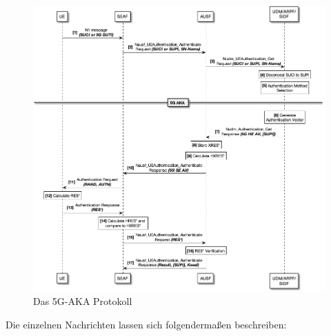 \begin{figure}[H]
  \centering
  \includegraphics[width=\textwidth]{uml/protocol_v1.png}
  \caption{Das 5G-AKA Protokoll}
  \label{fig:protocol_v1}
\end{figure}

Die einzelnen Nachrichten lassen sich folgendermaßen beschreiben: %

